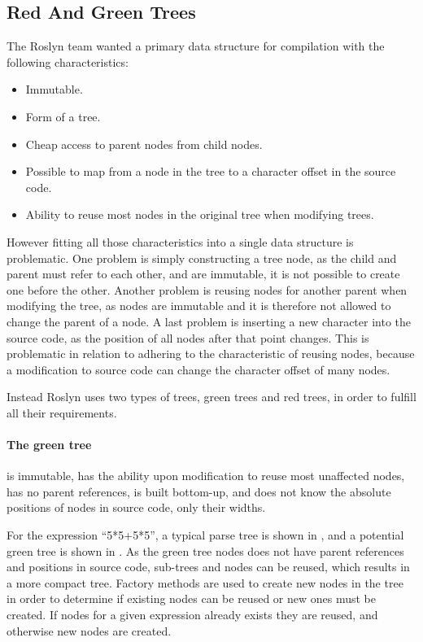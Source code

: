 \subsection{Red And Green Trees}
The Roslyn team wanted a primary data structure for compilation with the following characteristics\cite{lippert2012redgreen}:
\begin{itemize}
	\item Immutable.
	\item Form of a tree.
	\item Cheap access to parent nodes from child nodes.
	\item Possible to map from a node in the tree to a character offset in the source code.
	\item Ability to reuse most nodes in the original tree when modifying trees.
\end{itemize}
However fitting all those characteristics into a single data structure is problematic\cite{lippert2012redgreen}. One problem is simply constructing a tree node, as the child and parent must refer to each other, and are immutable, it is not possible to create one before the other. Another problem is reusing nodes for another parent when modifying the tree, as nodes are immutable and it is therefore not allowed to change the parent of a node. A last problem is inserting a new character into the source code, as the position of all nodes after that point changes. This is problematic in relation to adhering to the characteristic of reusing nodes, because a modification to source code can change the character offset of many nodes.

Instead Roslyn uses two types of trees, green trees and red trees, in order to fulfill all their requirements.

\paragraph{The green tree} is immutable, has the ability upon modification to reuse most unaffected nodes, has no parent references, is built bottom-up, and does not know the absolute positions of nodes in source code, only their widths\cite{lippert2012redgreen}.

For the expression ``5*5+5*5'', a typical parse tree is shown in , and a potential green tree is shown in . As the green tree nodes does not have parent references and positions in source code, sub-trees and nodes can be reused, which results in a more compact tree. Factory methods are used to create new nodes in the tree in order to determine if existing nodes can be reused or new ones must be created. If nodes for a given expression already exists they are reused, and otherwise new nodes are created. 

